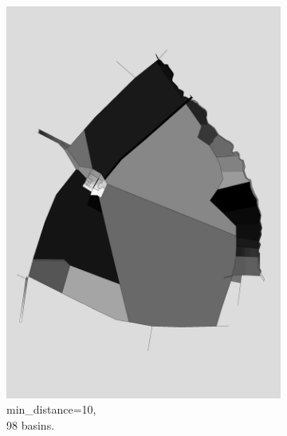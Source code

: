 \documentclass[12pt]{article}
\begin{document}
\begin{figure}[H]
\begin{subfigure}[b]{.3\textwidth}
		\includegraphics[width=1\linewidth]{images/polygon_recovery/watershed2_distance10_b98.png}  
	   	\caption{min\_distance=10, \\ 98 basins.}
	\end{subfigure}
	\begin{subfigure}[b]{.3\textwidth}
		\centering

\end{subfigure}
\end{figure}
\end{document}
